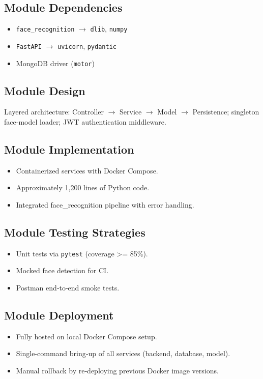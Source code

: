\documentclass[openany]{report}
\begin{document}
\subsection*{Module Dependencies}
\begin{itemize}
  \item \texttt{face\_recognition} $\rightarrow$ \texttt{dlib}, \texttt{numpy}
  \item \texttt{FastAPI} $\rightarrow$ \texttt{uvicorn}, \texttt{pydantic}
  \item MongoDB driver (\texttt{motor})
\end{itemize}

\subsection*{Module Design}
Layered architecture: Controller $\rightarrow$ Service $\rightarrow$ Model $\rightarrow$ Persistence; singleton face‐model loader; JWT authentication middleware.

\subsection*{Module Implementation}
\begin{itemize}
  \item Containerized services with Docker Compose.
  \item Approximately 1,200 lines of Python code.
  \item Integrated face\_recognition pipeline with error handling.
\end{itemize}

\subsection*{Module Testing Strategies}
\begin{itemize}
  \item Unit tests via \texttt{pytest} (coverage >= 85\%).
  \item Mocked face detection for CI.
  \item Postman end‐to‐end smoke tests.
\end{itemize}

\subsection*{Module Deployment}
\begin{itemize}
  \item Fully hosted on local Docker Compose setup.
  \item Single‐command bring‐up of all services (backend, database, model).
  \item Manual rollback by re‐deploying previous Docker image versions.
\end{itemize}
\end{document}
